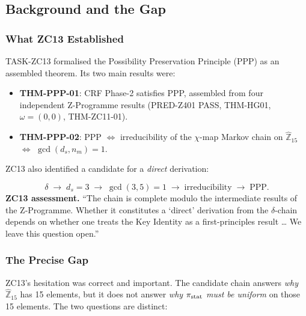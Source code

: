 \documentclass[12pt, a4paper]{article}
\begin{document}
\tableofcontents
\newpage

\subsection{Background and the Gap}
\label{zc14:sec:background}

\subsubsection{What ZC13 Established}

TASK-ZC13 formalised the Possibility Preservation Principle (PPP)
as an assembled theorem. Its two main results were:

\begin{itemize}[leftmargin=*, noitemsep]
  \item \textbf{THM-PPP-01}: CRF Phase-2 satisfies PPP, assembled
    from four independent Z-Programme results (PRED-Z401 PASS,
    THM-HG01, $\omega=(0,0)$, THM-ZC11-01).
  \item \textbf{THM-PPP-02}: PPP $\Leftrightarrow$ irreducibility
    of the $\chi$-map Markov chain on $\widehat{\mathbb{Z}}_{15}$
    $\Leftrightarrow$ $\gcd(d_s, n_m)=1$.
\end{itemize}

ZC13 also identified a candidate for a \emph{direct} derivation:

\begin{formalbox}[title={ZC13 Candidate Chain (GAP-PPP-01)}]
\[
  \delta \;\to\; d_s=3 \;\to\; \gcd(3,5)=1
  \;\to\; \text{irreducibility} \;\to\; \text{PPP.}
\]
\textbf{ZC13 assessment.} ``The chain is complete modulo the
intermediate results of the Z-Programme. Whether it constitutes
a `direct' derivation from the $\delta$-chain depends on whether
one treats the Key Identity as a first-principles result \ldots
We leave this question open.''
\end{formalbox}

\subsubsection{The Precise Gap}

ZC13's hesitation was correct and important. The candidate chain
answers \emph{why} $\widehat{\mathbb{Z}}_{15}$ has 15 elements, but
it does not answer \emph{why $\pi_{\rm stat}$ must be uniform} on
those 15 elements. The two questions are distinct:
\end{document}
